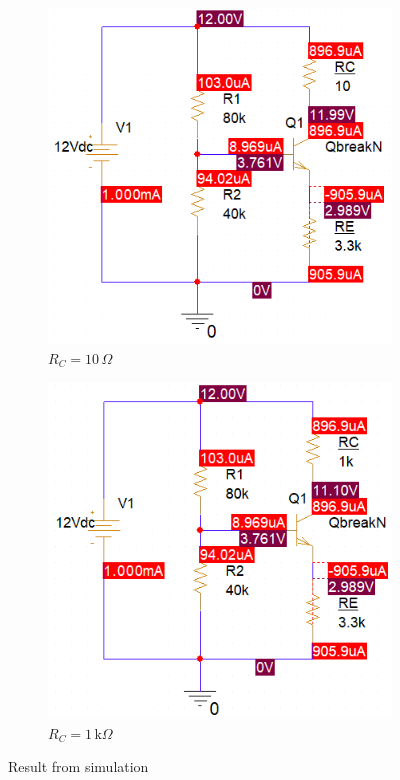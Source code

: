 \begin{figure}[ht]
    \centering
    \begin{subfigure}[b]{0.45\textwidth}
        \centering
        \includegraphics[width=\textwidth]{graphics/ex5/f2.PNG}
        \caption*{\(R_C=10\,\Omega\)}
    \end{subfigure}
    \hfill
    \begin{subfigure}[b]{0.45\textwidth}
        \centering
        \includegraphics[width=\textwidth]{graphics/ex5/f3.PNG}
        \caption*{\(R_C=1\,\text{k}\Omega\)}
    \end{subfigure}
    \caption{Result from simulation}
\end{figure}

